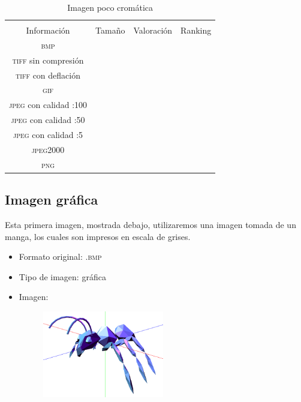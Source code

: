 \documentclass[11pt,a4paper]{article}
\begin{document}
\begin{table}[H]
\centering
\begin{tabular}{|c|c|c|c|}
\hline
\diagbox[width=15em]{\textit{Códec}/Formato}{\\Información} & Tamaño & Valoración & Ranking \\
\hline
\textsc{bmp} &  &  &  \\ \hline
\textsc{tiff} sin compresión &  &  &  \\ \hline
\textsc{tiff} con deflación &  &  &  \\ \hline
\textsc{gif} &  &  &  \\ \hline
\textsc{jpeg} con calidad :100 &  &  &  \\ \hline
\textsc{jpeg} con calidad :50 &  &  &  \\ \hline
\textsc{jpeg} con calidad :5 &  &  &  \\ \hline
\textsc{jpeg2000} &  &  &  \\ \hline
\textsc{png} &  &  &  \\ \hline
\end{tabular}
\caption{Imagen poco cromática}
\label{tab:my-table}
\end{table}


\subsection{Imagen gráfica}

Esta primera imagen, mostrada debajo, utilizaremos una imagen tomada de un manga, los cuales son impresos en escala de grises.

\begin{itemize}
	\item Formato original: \textsc{.bmp}
	\item Tipo de imagen: gráfica
	\item Imagen:
		\begin{figure}[H]
		\centering
			\includegraphics[width=0.5\textwidth]{Fotos/graficos.png}
		\end{figure}	
\end{itemize}
\end{document}
